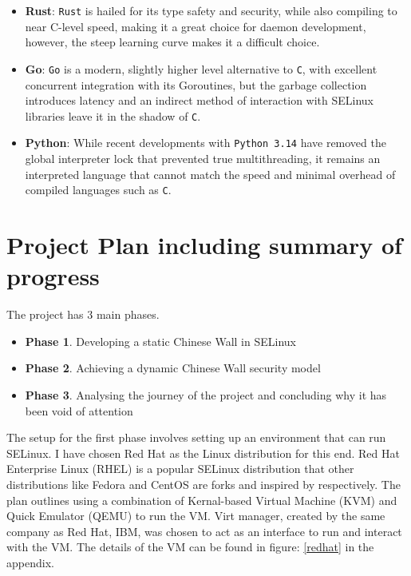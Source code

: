 \documentclass[11pt,titlepage,dvipsnames,table,xcdraw]{article}
\begin{document}
\begin{itemize}
  \item \textbf{Rust}: \verb_Rust_ is hailed for its type safety and security, while also compiling to near C-level speed, making it a great choice for daemon development, however, the steep learning curve makes it 
    a difficult choice.
  \item \textbf{Go}: \verb_Go_ is a modern, slightly higher level alternative to \verb_C_, with excellent concurrent integration with its Goroutines, but the garbage collection introduces latency
    and an indirect method of interaction with SELinux libraries leave it in the shadow of \verb_C_.
  \item \textbf{Python}: While recent developments with \verb_Python 3.14_ have removed the global interpreter lock that prevented true multithreading, it remains an interpreted language that cannot match the 
    speed and minimal overhead of compiled languages such as \verb_C_.
\end{itemize}



\clearpage
\section{Project Plan including summary of progress}
The project has 3 main phases. 
\begin{itemize}
  \item \textbf{Phase 1}. Developing a static Chinese Wall in SELinux
  \item \textbf{Phase 2}. Achieving a dynamic Chinese Wall security model
  \item \textbf{Phase 3}. Analysing the journey of the project and concluding why it has been void of attention
\end{itemize}

The setup for the first phase involves setting up an environment that can run SELinux. I have chosen Red Hat as the Linux distribution for this end. Red Hat Enterprise Linux (RHEL) is a popular SELinux distribution 
that other distributions like Fedora and CentOS are forks and inspired by respectively. The plan outlines using a combination of Kernal-based Virtual Machine (KVM) and Quick Emulator (QEMU) to run
the VM. Virt manager, created by the same company as Red Hat, IBM, was chosen to act as an interface to run and interact with the VM. The details of the VM can be found
in figure: \ref{redhat} in the appendix.
\end{document}
